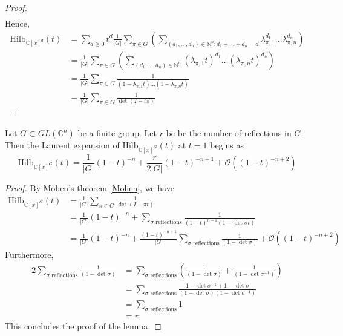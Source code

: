 \documentclass[envcountsame,envcountchap]{svmono}
\begin{document}
\begin{proof}
\begin{equation}
\begin{split}
 \end{split}
 \end{equation} Hence,
 \begin{equation}
 \begin{split}
 \text{Hilb}_{\mathbb{C}[\bar{x}]^d}(t) &= \sum_{d\ge 0} t^d \frac{1}{|G|} \sum_{\pi \in G}  \left( \sum_{(d_1, \ldots , d_n) \in\mathbb{N}^n: d_1 + \ldots + d_n = d} \lambda_{\pi, 1}^{d_1} \ldots \lambda_{\pi, n}^{d_n} \right) \\
 &= \frac{1}{|G|} \sum_{\pi \in G}  \left( \sum_{(d_1, \ldots , d_n) \in\mathbb{N}^n} (\lambda_{\pi, 1} t)^{d_1} \ldots (\lambda_{\pi, n} t)^{d_n} \right) \\
 &=  \frac{1}{|G|} \sum_{\pi \in G} \frac{1}{(1 -\lambda_{\pi, 1} t ) \ldots ( 1- \lambda_{\pi, n} t) } \\
 &= \frac{1}{|G|} \sum_{\pi \in G} \frac{1}{\det (I - t \pi)}
 \end{split}
 \end{equation}
 \end{proof}
 
 \begin{lemma}
 Let $G \subset GL( \mathbb{C}^n)$ be a finite group. Let $r$ be be the number of reflections in $G$. Then the Laurent expansion of $\text{Hilb}_{\mathbb{C}[\bar{x}]^G}(t)$ at $t=1$ begins as 
 \begin{equation}
 \text{Hilb}_{\mathbb{C}[\bar{x}]^G}(t)= \frac{1}{|G|} (1-t)^{-n} + \frac{r}{2|G|} (1-t)^{-n+1} + \mathcal{O}((1-t)^{-n+2})
 \end{equation}
 \label{lemma number refl}
 \end{lemma}
 \begin{proof}
 By Molien's theorem \ref{Molien}, we have
 \begin{equation}
 \begin{split}
 \text{Hilb}_{\mathbb{C}[\bar{x}]^G}(t) &= \frac{1}{|G|} \sum_{\pi\in G} \frac{1}{\det (I - \pi t)} \\
 &= \frac{1}{|G|} (1-t)^{-n} + \sum_{\sigma \text{ reflections}} \frac{1}{(1-t)^{n-1}(1- \det \sigma  t)} \\
 &= \frac{1}{|G|} (1-t)^{-n} + \frac{(1-t)^{-n+1}}{|G|} \sum_{\sigma \text{ reflections}} \frac{1}{(1- \det \sigma  )} + \mathcal{O}((1-t)^{-n+2})
 \end{split}
\end{equation}  Furthermore, 
\begin{equation}
\begin{split}
2 \sum_{\sigma \text{ reflections}} \frac{1}{(1 - \det \sigma)} &= \sum_{\sigma \text{ reflections}} \left( \frac{1}{(1 - \det \sigma)} +  \frac{1}{(1 - \det \sigma^{-1})} \right) \\
&= \sum_{\sigma \text{ reflections}} \frac{1 - \det \sigma^{-1} + 1 - \det \sigma}{(1 - \det \sigma)(1 - \det \sigma^{-1})} \\
&=\sum_{\sigma \text{ reflections}} 1 \\
&= r
\end{split}
\end{equation} This concludes the proof of the lemma.
 \end{proof}
 
\end{document}
